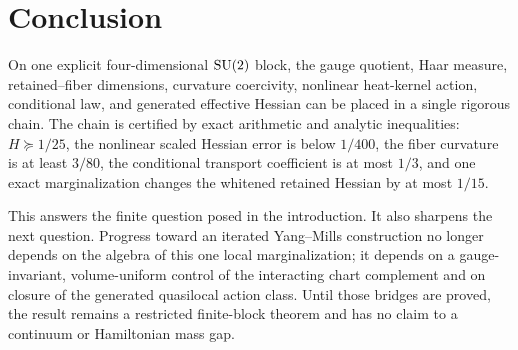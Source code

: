 \section{Conclusion}\label{sec:conclusion}

On one explicit four-dimensional $\mathrm{SU}(2)$ block, the gauge quotient, Haar
measure, retained--fiber dimensions, curvature coercivity, nonlinear
heat-kernel action, conditional law, and generated effective Hessian can be
placed in a single rigorous chain.  The chain is certified by exact arithmetic
and analytic inequalities: $H\succeq1/25$, the nonlinear scaled Hessian error
is below $1/400$, the fiber curvature is at least $3/80$, the conditional
transport coefficient is at most $1/3$, and one exact marginalization changes
the whitened retained Hessian by at most $1/15$.

This answers the finite question posed in the introduction.  It also sharpens
the next question.  Progress toward an iterated Yang--Mills construction no
longer depends on the algebra of this one local marginalization; it depends on
a gauge-invariant, volume-uniform control of the interacting chart complement
and on closure of the generated quasilocal action class.  Until those bridges
are proved, the result remains a restricted finite-block theorem and has no
claim to a continuum or Hamiltonian mass gap.
